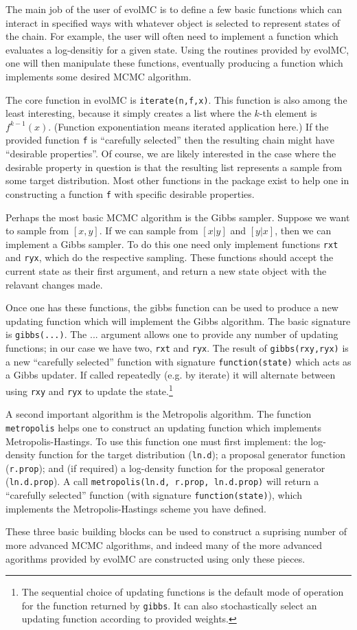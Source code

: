 \documentclass{article}\usepackage[]{graphicx}\usepackage[]{color}
\begin{document}
The main job of the user of evolMC is to define a few basic functions
which can interact in specified ways with whatever object is selected
to represent states of the chain. For example, the user will often
need to implement a function which evaluates a log-densitiy for a
given state. Using the routines provided by evolMC, one will then
manipulate these functions, eventually producing a function which
implements some desired MCMC algorithm.

The core function in evolMC is
\texttt{iterate(n,f,x)}. This function is also among the least
interesting, because it simply creates a list where the $k$-th element
is $f^{k-1}(x)$. (Function exponentiation means iterated application
here.) If the provided function {\tt f} is ``carefully selected'' then the
resulting chain might have ``desirable properties''. Of course, we are
likely interested in the case where the desirable property in
question is that the resulting list represents a sample from some
target distribution. Most other functions in the package exist to help
one in constructing a function {\tt f} with specific desirable properties.

Perhaps the most basic MCMC algorithm is the Gibbs sampler. Suppose we
want to sample from $[x,y]$. If we can sample from $[x|y]$ and
$[y|x]$, then we can implement a Gibbs sampler. To do this one need
only implement functions {\tt rxt} and {\tt ryx}, which do the
respective sampling. These
functions should accept the current state as their first argument, and
return a new state object with the relavant changes made.

Once one has these functions, the gibbs function can be used to
produce a new updating function which will implement the Gibbs
algorithm. The basic signature is {\tt gibbs(...)}. The ...  argument
allows one to provide any number of updating functions; in our case we
have two, {\tt rxt} and {\tt ryx}. The result of {\tt gibbs(rxy,ryx)}
is a new ``carefully selected'' function with signature
\texttt{function(state)} which acts as a Gibbs updater. If called
repeatedly (e.g. by iterate) it will alternate between using {\tt rxy}
and {\tt ryx} to update the state.\footnote{The sequential choice of
  updating functions is the default mode of operation for the function
  returned by {\tt gibbs}. It can also stochastically select an
  updating function according to provided weights.}

A second important algorithm is the Metropolis algorithm. The function
{\tt metropolis} helps one to construct an updating function which
implements Metropolis-Hastings. To use this function one must first implement:
the log-density function for the target distribution ({\tt ln.d}); a proposal
generator function ({\tt r.prop}); and (if required) a log-density function for the
proposal generator ({\tt ln.d.prop}). A call {\tt metropolis(ln.d,
  r.prop, ln.d.prop)} will return a ``carefully selected'' function
(with signature {\tt function(state)}), which implements the
Metropolis-Hastings scheme you have defined.

These three basic building blocks can be used to construct a suprising
number of more advanced MCMC algorithms, and indeed many of the more
advanced agorithms provided by evolMC are constructed using only these pieces.
\end{document}
